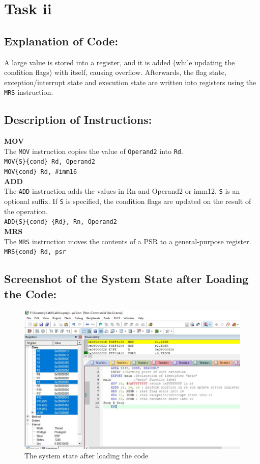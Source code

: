\documentclass[12pt]{article}
\begin{document}
\section{Task ii}
\subsection{Explanation of Code:}
A large value is stored into a register, and it is added (while updating the condition flags) with itself, causing overflow. Afterwards, the flag state, exception/interrupt state and execution state are written into registers using the \verb|MRS| instruction.
\subsection{Description of Instructions:}
\textbf{MOV}\\
The \verb|MOV| instruction copies the value of \verb|Operand2| into \verb|Rd|.\\
\verb|MOV{S}{cond} Rd, Operand2|\\
\verb|MOV{cond} Rd, #imm16|\\
\textbf{ADD}\\
The \verb|ADD| instruction adds the values in Rn and Operand2 or imm12. \verb|S| is an optional suffix. If \verb|S| is specified, the condition flags are updated on the result of the operation.\\
\verb|ADD{S}{cond} {Rd}, Rn, Operand2|\\
\textbf{MRS}\\
The \verb|MRS| instruction moves the contents of a PSR to a general-purpose register.
\verb|MRS{cond} Rd, psr|
\pagebreak
\subsection{Screenshot of the System State after Loading the Code:}
\begin{figure}[ht]
     \centering
     \includegraphics[scale=.7]{images/beforetask2.JPG}
     \caption{The system state after loading the code}
     \label{fig:before_task_two}
 \end{figure}
 \pagebreak
\end{document}
